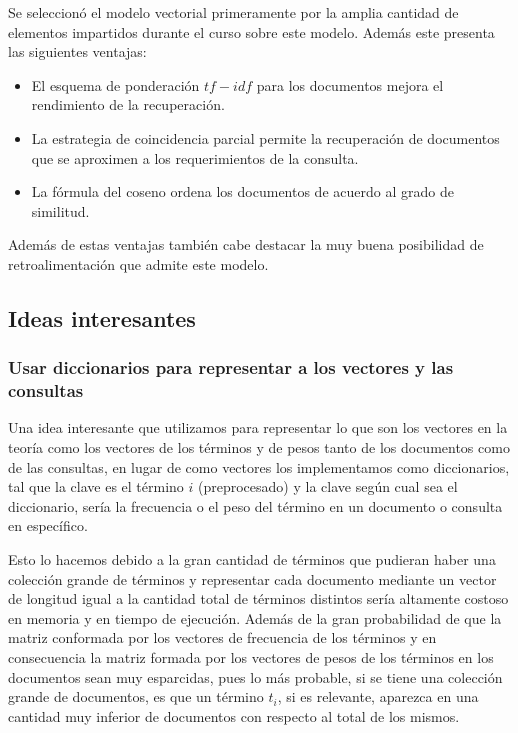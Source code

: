 \documentclass[runningheads]{llncs}
\begin{document}
	Se seleccion\'o el modelo vectorial primeramente por la amplia cantidad de elementos impartidos durante el curso sobre este modelo. Adem\'as este presenta las siguientes ventajas:
	
	\begin{itemize}
		\item El esquema de ponderaci\'on $tf-idf$ para los documentos mejora el rendimiento de la recuperaci\'on.
		\item La estrategia de coincidencia parcial permite la recuperaci\'on de documentos que se aproximen a los requerimientos de la consulta.
		\item La f\'ormula del coseno ordena los documentos de acuerdo al grado de similitud.
	\end{itemize}

	Adem\'as de estas ventajas tambi\'en cabe destacar la muy buena posibilidad de retroalimentaci\'on que admite este modelo.
	
	\subsection{Ideas interesantes}
	
	\subsubsection{Usar diccionarios para representar a los vectores y las consultas}
	Una idea interesante que utilizamos para representar lo que son los vectores en la teor\'ia como los vectores de los t\'erminos y de pesos tanto de los documentos como de las consultas, en lugar de como vectores los implementamos como diccionarios, tal que la clave es el t\'ermino $i$ (preprocesado) y la clave seg\'un cual sea el diccionario, ser\'ia la frecuencia o el peso del t\'ermino en un documento o consulta en espec\'ifico. 
	
	Esto lo hacemos debido a la gran cantidad de t\'erminos que pudieran haber una colecci\'on grande de t\'erminos y representar cada documento mediante un vector de longitud igual a la cantidad total de t\'erminos distintos ser\'ia altamente costoso en memoria y en tiempo de ejecuci\'on. Adem\'as de la gran probabilidad de que la matriz conformada por los vectores de frecuencia de los t\'erminos y en consecuencia la matriz formada por los vectores de pesos de los t\'erminos en los documentos sean muy esparcidas, pues lo m\'as probable, si se tiene una colecci\'on grande de documentos, es que un t\'ermino $t_i$, si es relevante, aparezca en una cantidad muy inferior de documentos con respecto al total de los mismos.
	
\end{document}
